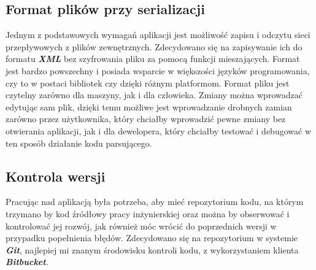 \subsection{Format plików przy serializacji}
Jednym z podstawowych wymagań aplikacji jest możliwość zapisu i odczytu sieci przepływowych z plików zewnętrznych. Zdecydowano się na zapisywanie ich do formatu \textbf{\textit{XML}} bez szyfrowania pliku za pomocą funkcji mieszających. Format jest bardzo powszechny i posiada wsparcie w większości języków programowania, czy to w postaci bibliotek czy dzięki różnym platformom. Format pliku jest czytelny zarówno dla maszyny, jak i dla człowieka. Zmiany można wprowadzać edytując sam plik, dzięki temu możliwe jest wprowadzanie drobnych zamian zarówno przez użytkownika, który chciałby wprowadzić pewne zmiany bez otwierania aplikacji, jak i dla dewelopera, który chciałby testować i debugować w ten sposób działanie kodu parsującego.
\subsection{Kontrola wersji}\label{ssec:kontrolaWersji}
Pracując nad aplikacją była potrzeba, aby mieć repozytorium kodu, na którym trzymano by kod źródłowy pracy inżynierskiej oraz można by obserwować i kontrolować jej rozwój, jak również móc wrócić do poprzednich wersji w przypadku popełnienia błędów. Zdecydowano się na repozytorium w systemie \textbf{\textit{Git}}, najlepiej mi znanym środowisku kontroli kodu, z wykorzystaniem klienta \textbf{\textit{Bitbucket}}.